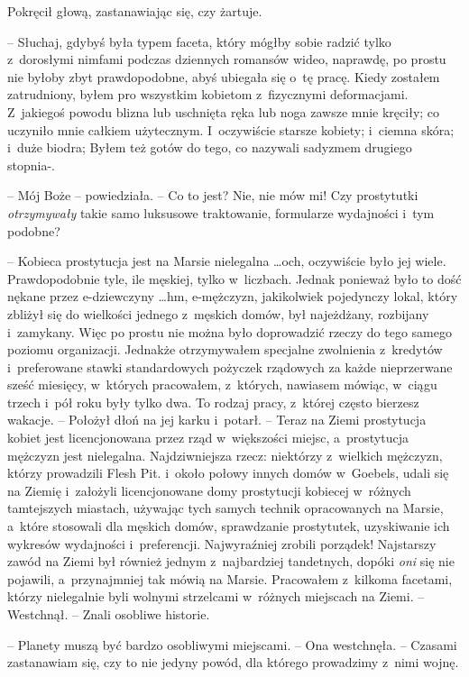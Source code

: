 \documentclass[oneside,polish,11pt,rmheadings]{mwbk}
\begin{document}
Pokręcił głową, zastanawiając się, czy żartuje. 

-- Słuchaj, gdybyś była typem faceta, który mógłby sobie radzić tylko z~dorosłymi nimfami podczas dziennych romansów wideo, naprawdę, po prostu nie byłoby zbyt prawdopodobne, abyś ubiegała się o~tę pracę. Kiedy zostałem zatrudniony, byłem pro wszystkim kobietom z~fizycznymi deformacjami. Z~jakiegoś powodu blizna lub uschnięta ręka lub noga zawsze mnie kręciły; co uczyniło mnie całkiem użytecznym. I~oczywiście starsze kobiety; i~ciemna skóra; i~duże biodra; Byłem też gotów do tego, co nazywali sadyzmem drugiego stopnia-. 

-- Mój Boże -- powiedziała. -- Co to jest? Nie, nie mów mi! Czy prostytutki \textit{otrzymywały }takie samo luksusowe traktowanie, formularze wydajności i~tym podobne? 

-- Kobieca prostytucja jest na Marsie nielegalna \ldots  och, oczywiście było jej wiele. Prawdopodobnie tyle, ile męskiej, tylko w~liczbach. Jednak ponieważ było to dość nękane przez e-dziewczyny \ldots  hm, e-mężczyzn, jakikolwiek pojedynczy lokal, który zbliżył się do wielkości jednego z~męskich domów, był najeżdżany, rozbijany i~zamykany. Więc po prostu nie można było doprowadzić rzeczy do tego samego poziomu organizacji. Jednakże otrzymywałem specjalne zwolnienia z~kredytów i~preferowane stawki standardowych pożyczek rządowych za każde nieprzerwane sześć miesięcy, w~których pracowałem, z~których, nawiasem mówiąc, w~ciągu trzech i~pół roku były tylko dwa. To rodzaj pracy, z~której często bierzesz wakacje. -- Położył dłoń na jej karku i~potarł. -- Teraz na Ziemi prostytucja kobiet jest licencjonowana przez rząd w~większości miejsc, a~prostytucja mężczyzn jest nielegalna. Najdziwniejsza rzecz: niektórzy z~wielkich mężczyzn, którzy prowadzili Flesh Pit. i~około połowy innych domów w~Goebels, udali się na Ziemię i~założyli licencjonowane domy prostytucji kobiecej w~różnych tamtejszych miastach, używając tych samych technik opracowanych na Marsie, a~które stosowali dla męskich domów, sprawdzanie prostytutek, uzyskiwanie ich wykresów wydajności i~preferencji. Najwyraźniej zrobili porządek! Najstarszy zawód na Ziemi był również jednym z~najbardziej tandetnych, dopóki \textit{oni }się nie pojawili, a~przynajmniej tak mówią na Marsie. Pracowałem z~kilkoma facetami, którzy nielegalnie byli wolnymi strzelcami w~różnych miejscach na Ziemi. -- Westchnął. --  Znali osobliwe historie. 

-- Planety muszą być bardzo osobliwymi miejscami. -- Ona westchnęła.  -- Czasami zastanawiam się, czy to nie jedyny powód, dla którego prowadzimy z~nimi wojnę. 
\end{document}
